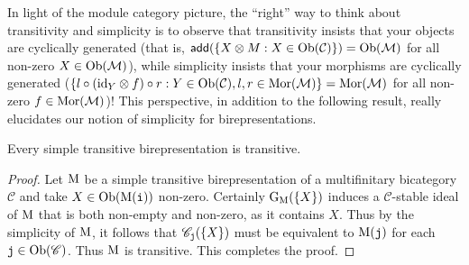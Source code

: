 \noindent\begin{remark} In light of the module category picture, the ``right'' way to think about transitivity and simplicity is to observe that transitivity insists that your objects are cyclically generated (that is, $\textsf{add}(\{X \otimes M : X \in \textnormal{Ob}(\mathcal{C})\}) = \textnormal{Ob}(\mathcal{M})$ for all non-zero $X \in \textnormal{Ob}(\mathcal{M})$), while simplicity insists that your morphisms are cyclically generated ($\{l \circ (\textup{id}_Y \otimes f) \circ r : Y \in \textnormal{Ob}(\mathcal{C}), l, r \in \textnormal{Mor}(\mathcal{M})\} = \textnormal{Mor}(\mathcal{M})$ for all non-zero $f \in \textnormal{Mor}(\mathcal{M})$)! This perspective, in addition to the following result, really elucidates our notion of simplicity for birepresentations.\end{remark}\newpage


\noindent\begin{proposition} Every simple transitive birepresentation is transitive.\\
\end{proposition}

\noindent\begin{proof} %
Let $\textup{M}$ be a simple transitive birepresentation of a multifinitary bicategory $\mathscr{C}$ and take $X \in \textnormal{Ob}(\textup{M}(\textnormal{\texttt{i}}))$ non-zero. Certainly $\textup{G}_\textup{M}(\{X\})$ induces a $\mathscr{C}$-stable ideal of $\textup{M}$ that is both non-empty and non-zero, as it contains $X$. Thus by the simplicity of $\textup{M}$, it follows that $\mathscr{C}_{\textnormal{\texttt{j}}}(\{X\})$ must be equivalent to $\textup{M}(\textnormal{\texttt{j}})$ for each $\textnormal{\texttt{j}} \in \textnormal{Ob}(\mathscr{C})$. Thus $\textup{M}$ is transitive. This completes the proof.
\end{proof}\\

